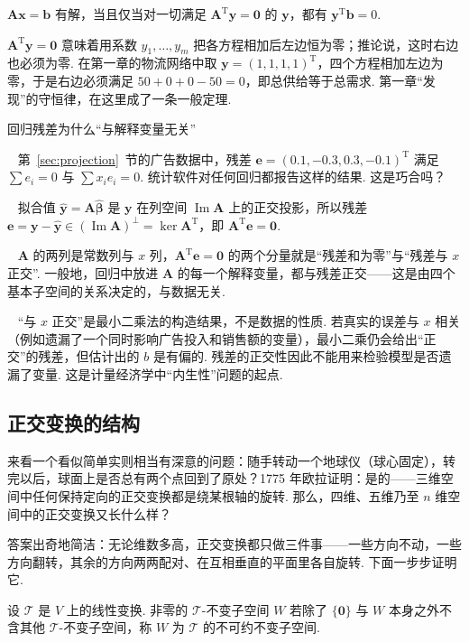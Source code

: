 \documentclass[lang=cn,10.5pt,scheme=chinese,toc=twocol,section,chinesefont=nofont,
twoside,citestyle=gb7714-2015,bibstyle=gb7714-2015]{elegantbook}
\DeclareRobustCommand{\textbf}[1]{{\lnsemiboldlatin\lnsemiboldcjk #1}}
\newcommand{\vv}[1]{\boldsymbol{#1}}
\newcommand{\zero}{\boldsymbol{0}}          %
\newcommand{\trans}{\mathrm{T}}             %
\numberwithin{equation}{section}   %
\newcommand{\imm}{\operatorname{Im}}        %
\newcommand{\hC}{\texorpdfstring{\textdaggerdbl}{‡}}
\newcommand{\mstep}[1]{\par\smallskip\noindent\textbf{【#1】}\ }
\begin{document}
\begin{corollary}[相容性条件]
  $\vv{Ax}=\vv b$ 有解，当且仅当对一切满足 $\vv A^\trans\vv y=\zero$ 的 $\vv y$，都有 $\vv y^\trans\vv b=0$.
\end{corollary}

$\vv A^\trans\vv y=\zero$ 意味着用系数 $y_1,\ldots,y_m$ 把各方程相加后左边恒为零；推论说，这时右边也必须为零. 在第一章的物流网络中取 $\vv y=(1,1,1,1)^\trans$，四个方程相加左边为零，于是右边必须满足 $50+0+0-50=0$，即总供给等于总需求. 第一章“发现”的守恒律，在这里成了一条一般定理.

\begin{modelbox}{回归残差为什么“与解释变量无关”}
  \mstep{问题} 第~\ref{sec:projection}~节的广告数据中，残差 $\vv e=(0.1,-0.3,0.3,-0.1)^\trans$ 满足 $\sum e_i=0$ 与 $\sum x_ie_i=0$. 统计软件对任何回归都报告这样的结果. 这是巧合吗？

  \mstep{求解} 拟合值 $\hat{\vv y}=\vv A\hat{\vv\beta}$ 是 $\vv y$ 在列空间 $\imm\vv A$ 上的正交投影，所以残差 $\vv e=\vv y-\hat{\vv y}\in(\imm\vv A)^\perp=\ker\vv A^\trans$，即 $\vv A^\trans\vv e=\zero$.

  \mstep{解读} $\vv A$ 的两列是常数列与 $x$ 列，$\vv A^\trans\vv e=\zero$ 的两个分量就是“残差和为零”与“残差与 $x$ 正交”. 一般地，回归中放进 $\vv A$ 的每一个解释变量，都与残差正交——这是由四个基本子空间的关系决定的，与数据无关.

  \mstep{局限} “与 $x$ 正交”是最小二乘法的\textbf{构造结果}，不是数据的性质. 若真实的误差与 $x$ 相关（例如遗漏了一个同时影响广告投入和销售额的变量），最小二乘仍会给出“正交”的残差，但估计出的 $b$ 是有偏的. 残差的正交性因此\textbf{不能}用来检验模型是否遗漏了变量. 这是计量经济学中“内生性”问题的起点.
\end{modelbox}

\subsection{\hC 正交变换的结构}

来看一个看似简单实则相当有深意的问题：随手转动一个地球仪（球心固定），转完以后，球面上是否\textbf{总有}两个点回到了原处？1775 年欧拉证明：是的——三维空间中任何保持定向的正交变换都是绕某根轴的旋转. 那么，四维、五维乃至 $n$ 维空间中的正交变换又长什么样？

答案出奇地简洁：\textbf{无论维数多高，正交变换都只做三件事——一些方向不动，一些方向翻转，其余的方向两两配对、在互相垂直的平面里各自旋转.} 下面一步步证明它.

\begin{definition}
  设 $\mathscr T$ 是 $V$ 上的线性变换. 非零的 $\mathscr T$-不变子空间 $W$ 若除了 $\{\zero\}$ 与 $W$ 本身之外不含其他 $\mathscr T$-不变子空间，称 $W$ 为 $\mathscr T$ 的\textbf{不可约}不变子空间.
\end{definition}
\end{document}
